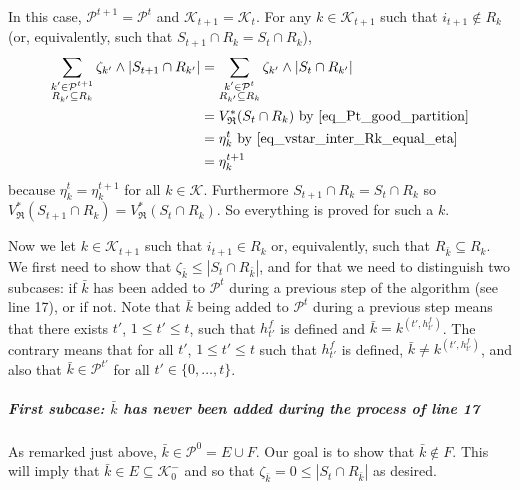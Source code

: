 \documentclass[
  11pt,
  a4paper,
]{article}
\let\oldsubparagraph\subparagraph
\renewcommand{\subparagraph}[1]{\oldsubparagraph{#1}\mbox{}}
\theoremstyle{plain}
\theoremstyle{definition}
\theoremstyle{plain}
\theoremstyle{definition}
\theoremstyle{plain}
\theoremstyle{remark}
\begin{document}
In this case, \(\mathcal{P}^{t+1}=\mathcal{P}^t\) and
\(\mathcal{K}_{t+1}=\mathcal{K}_t\). For any \(k\in\mathcal{K}_{t+1}\)
such that \(i_{t+1}\not\in R_k\) (or, equivalently, such that
\(S_{t+1}\cap R_k=S_t\cap R_k\)), \begin{align*}
\sum_{\substack{k'\in\mathcal{P}^{t+1} \\ R_{k'}\subseteq R_k}} \zeta_{k'}\wedge |S_{t+1}\cap R_{k'}|&=\sum_{\substack{k'\in\mathcal{P}^{t} \\ R_{k'}\subseteq R_k}} \zeta_{k'}\wedge |S_{t}\cap R_{k'}| \\
&=V^*_{\mathfrak{R}}(S_t\cap R_k) \text{ by~\eqref{eq_Pt_good_partition}}\\
&=\eta_k^t \text{ by~\eqref{eq_vstar_inter_Rk_equal_eta}}\\
&=\eta_k^{t+1}
\end{align*} because \(\eta_k^t=\eta_k^{t+1}\) for all
\(k\in\mathcal{K}\). Furthermore \(S_{t+1}\cap R_k=S_t\cap R_k\) so
\(V^*_{\mathfrak{R}}(S_{t+1}\cap R_k)=V^*_{\mathfrak{R}}(S_t\cap R_k)\).
So everything is proved for such a \(k\).

Now we let \(k\in\mathcal{K}_{t+1}\) such that \(i_{t+1}\in R_k\) or,
equivalently, such that \(R_{\bar k}\subseteq R_k\). We first need to
show that \(\zeta_{\bar k}\leq |S_t\cap R_{\bar k}|\), and for that we
need to distinguish two subcases: if \(\bar k\) has been added to
\(\mathcal{P}^t\) during a previous step of the algorithm (see line 17),
or if not. Note that \(\bar k\) being added to \(\mathcal{P}^t\) during
a previous step means that there exists \(t'\), \(1\leq t'\leq t\), such
that \(h^f_{t'}\) is defined and \(\bar k= k^{(t',h^f_{t'})}\). The
contrary means that for all \(t'\), \(1\leq t'\leq t\) such that
\(h^f_{t'}\) is defined, \(\bar k\neq k^{(t',h^f_{t'})}\), and also that
\(\bar k\in\mathcal{P}^{t'}\) for all \(t'\in\{0,\dotsc,t\}\).

\subparagraph{\texorpdfstring{First subcase: \(\bar k\) has never been
added during the process of line
17}{First subcase: \textbackslash bar k has never been added during the process of line 17}}\label{first-subcase-bar-k-has-never-been-added-during-the-process-of-line-17}

As remarked just above, \(\bar k\in\mathcal{P}^{0}=E\cup F\). Our goal
is to show that \(\bar k\not\in F\). This will imply that
\(\bar k\in E\subseteq \mathcal{K}_0^-\) and so that
\(\zeta_{\bar k}=0\leq| S_{t}\cap R_{\bar k} |\) as desired.
\end{document}
